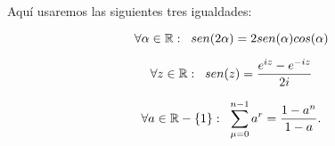 Aquí usaremos las siguientes tres igualdades:

\begin{equation}
\label{eq10: 19Marzo}
\forall \alpha \in \mathbb{R}: \hspace{0.2cm}
sen(2 \alpha) = 2 sen(\alpha) cos(\alpha)
\end{equation}



\begin{equation}
\label{eq11: 19Marzo}
\forall z\in \mathbb{R}: \hspace{0.2cm}
sen(z)= \frac{e^{iz}-e^{-iz}}{2i}
\end{equation}



\begin{equation}
\label{eq12: 19Marzo}
\forall a \in \mathbb{R}-\{ 1 \}: \hspace{0.2cm}
\sum\limits_{\mu=0}^{n-1}a^{r}= \frac{1-a^{n}}{1-a}.
\end{equation}


